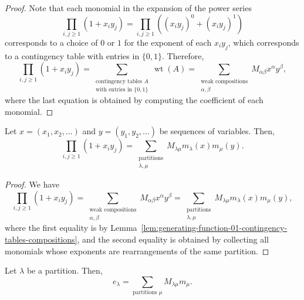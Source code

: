 \begin{proof}
Note that each monomial in the expansion of the power series
\begin{equation}
	\prod_{i, j \geq 1} (1 + x_iy_j)
	= \prod_{i, j \geq 1} \left( (x_iy_j)^0 + (x_iy_j)^1 \right)
\end{equation}
corresponds to a choice of \(0\) or \(1\) for the exponent of each \(x_iy_j\), which corresponds to a contingency table with entries in \(\{0, 1\}\).
Therefore,
\begin{equation}
	\prod_{i, j \geq 1} (1 + x_iy_j)
	= \sum_{\substack{\text{contingency tables } A \\ \text{with entries in } \{0, 1\}}} \operatorname{wt}(A) 
	= \sum_{\substack{\text{weak compositions} \\ \alpha, \beta}} M_{\alpha\beta} x^\alpha y^\beta, 
\end{equation}
where the last equation is obtained by computing the coefficient of each monomial.
\end{proof}

\begin{proposition} \label{prop:generating-function-01-contingency-tables-partitions}
	Let \(x = (x_1, x_2, \ldots)\) and \(y = (y_1, y_2, \ldots)\) be sequences of variables.
	Then,
	\begin{equation}
		\prod_{i, j \geq 1} (1 + x_iy_j) = \sum_{\substack{\text{partitions} \\ \lambda, \mu}} M_{\lambda\mu} m_\lambda(x) m_\mu(y).
	\end{equation}
\end{proposition}

\begin{proof}
	We have
\begin{equation}
	\prod_{i, j \geq 1} (1 + x_iy_j)
	= \sum_{\substack{\text{weak compositions} \\ \alpha, \beta}} M_{\alpha\beta} x^\alpha y^\beta
	= \sum_{\substack{\text{partitions} \\ \lambda, \mu}} M_{\lambda\mu} m_\lambda(x) m_\mu(y),
\end{equation}
where the first equality is by Lemma~\ref{lem:generating-function-01-contingency-tables-compositions},
and the second equality is obtained by collecting all monomials whose exponents are rearrangements of the same partition.
\end{proof}

\begin{proposition} \label{prop:el-expansion-in-m-basis}
	Let \(\lambda\) be a partition.
	Then,
	\begin{equation}
		e_\lambda = \sum_{\text{partitions } \mu} M_{\lambda\mu} m_\mu.
	\end{equation}
\end{proposition}

